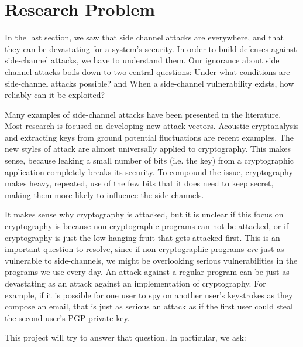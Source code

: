 \documentclass{acm_proc_article-sp}
\begin{document}
\section{Research Problem}
\label{sec:problem}

In the last section, we saw that side channel attacks are everywhere, and that
they can be devastating for a system's security. In order to build defenses
against side-channel attacks, we have to understand them. Our ignorance about
side channel attacks boils down to two central questions: Under what conditions
are side-channel attacks possible? and When a side-channel vulnerability exists,
how reliably can it be exploited?

Many examples of side-channel attacks have been presented in the literature.
Most research is focused on developing new attack vectors. Acoustic
cryptanalysis \cite{genkin2013rsa} and extracting keys from ground potential
fluctuations \cite{genkin2014get} are recent examples. The new styles of attack
are almost universally applied to cryptography. This makes sense, because
leaking a small number of bits (i.e. the key) from a cryptographic application
completely breaks its security. To compound the issue, cryptography makes heavy,
repeated, use of the few bits that it does need to keep secret, making them more
likely to influence the side channels.

It makes sense why cryptography is attacked, but it is unclear if this focus on
cryptography is because non-cryptographic programs can not be attacked, or if
cryptography is just the low-hanging fruit that gets attacked first. This is an
important question to resolve, since if non-cryptographic programs \emph{are}
just as vulnerable to side-channels, we might be overlooking serious
vulnerabilities in the programs we use every day. An attack against a regular
program can be just as devastating as an attack against an implementation of
cryptography. For example, if it is possible for one user to spy on another
user's keystrokes as they compose an email, that is just as serious an attack as
if the first user could steal the second user's PGP private key.

This project will try to answer that question. In particular, we ask:
\end{document}
